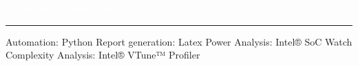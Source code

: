 \begin{titlepage}
\BgThispage
{}
\noindent
\textcolor{white}{\bigsf Complexity \& Power Analysis}
\vspace*{2.5cm}\par
\noindent
\begin{minipage}{0.35\linewidth}
    \begin{flushright}
        \printauthor
    \end{flushright}
\end{minipage} \hspace{15pt}
%
\begin{minipage}{0.02\linewidth}
    \rule{2pt}{275pt}
\end{minipage} \hspace{-10pt}
%
\begin{minipage}{0.6\linewidth}
\vspace{5pt}

{\huge Automation: Python
\newline Report generation: Latex
\newline Power Analysis: Intel® SoC Watch
\newline Complexity Analysis: Intel® VTune™ Profiler
}
\newline {}

\end{minipage}
\end{titlepage}

\restoregeometry%